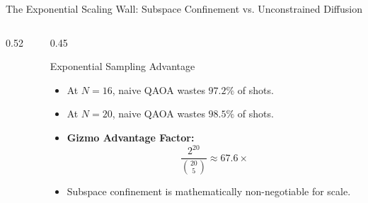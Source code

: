 \documentclass[aspectratio=169,10pt]{beamer}
\begin{document}
\begin{frame}{The Exponential Scaling Wall: Subspace Confinement vs. Unconstrained Diffusion}
\begin{columns}
\begin{column}{0.52\textwidth}
\end{column}

\begin{column}{0.45\textwidth}
\begin{block}{Exponential Sampling Advantage}
\begin{itemize}
    \item At $N=16$, naive QAOA wastes $\mathbf{97.2\%}$ of shots.
    \item At $N=20$, naive QAOA wastes $\mathbf{98.5\%}$ of shots.
    \item \textbf{Gizmo Advantage Factor:}
    \begin{equation*}
    \frac{2^{20}}{\binom{20}{5}} \approx \mathbf{67.6\times}
    \end{equation*}
    \item Subspace confinement is mathematically non-negotiable for scale.
\end{itemize}
\end{block}
\end{column}
\end{columns}
\end{frame}
\end{document}
